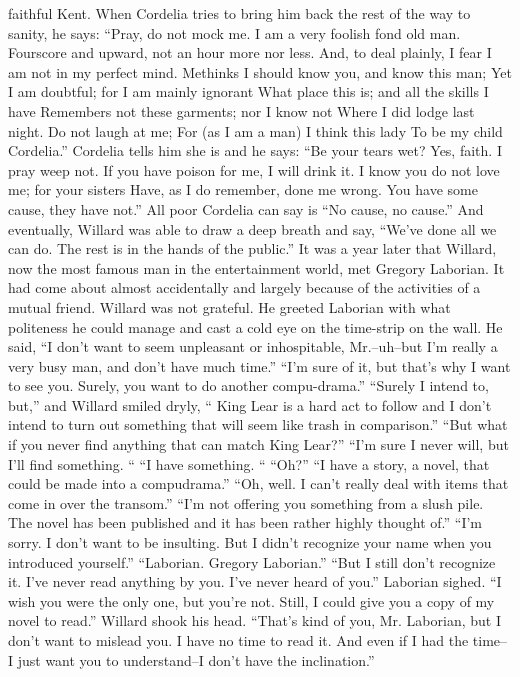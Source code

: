 \documentclass[a4paper,12pt]{article}
\begin{document}
faithful Kent.
When Cordelia tries to bring him back the rest of the way to sanity, he says:
“Pray, do not mock me.
I am a very foolish fond old man.
Fourscore and upward, not an hour more nor less.
And, to deal plainly,
I fear I am not in my perfect mind.
Methinks I should know you, and know this man;
Yet I am doubtful; for I am mainly ignorant
What place this is; and all the skills I have
Remembers not these garments; nor I know not
Where I did lodge last night. Do not laugh at me;
For (as I am a man) I think this lady
To be my child Cordelia.”
Cordelia tells him she is and he says:
“Be your tears wet? Yes, faith. I pray weep not.
If you have poison for me, I will drink it.
I know you do not love me; for your sisters
Have, as I do remember, done me wrong.
You have some cause, they have not.”
All poor Cordelia can say is “No cause, no cause.”
And eventually, Willard was able to draw a deep breath and say, “We’ve done all we can do. The
rest is in the hands of the public.”
It was a year later that Willard, now the most famous man in the entertainment world, met
Gregory Laborian. It had come about almost accidentally and largely because of the activities of a mutual
friend. Willard was not grateful.
He greeted Laborian with what politeness he could manage and cast a cold eye on the time-strip
on the wall.
He said, “I don’t want to seem unpleasant or inhospitable, Mr.--uh--but I’m really a very busy
man, and don’t have much time.”
“I’m sure of it, but that’s why I want to see you. Surely, you want to do another compu-drama.”
“Surely I intend to, but,” and Willard smiled dryly, “ King Lear is a hard act to follow and I don’t
intend to turn out something that will seem like trash in comparison.”
“But what if you never find anything that can match King Lear?”
“I’m sure I never will, but I’ll find something. “
“I have something. “
“Oh?”
“I have a story, a novel, that could be made into a compudrama.”
“Oh, well. I can’t really deal with items that come in over the transom.”
“I’m not offering you something from a slush pile. The novel has been published and it has been
rather highly thought of.”
“I’m sorry. I don’t want to be insulting. But I didn’t recognize your name when you introduced
yourself.”
“Laborian. Gregory Laborian.”
“But I still don’t recognize it. I’ve never read anything by you. I’ve never heard of you.”
Laborian sighed. “I wish you were the only one, but you’re not. Still, I could give you a copy of
my novel to read.”
Willard shook his head. “That’s kind of you, Mr. Laborian, but I don’t want to mislead you. I have
no time to read it. And even if I had the time--I just want you to understand--I don’t have the inclination.”
\end{document}
